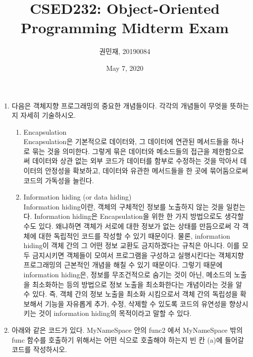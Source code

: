 \documentclass{article}
\begin{document}
    \author{권민재, 20190084}
    \title{CSED232: Object-Oriented Programming Midterm Exam}
    \date{May 7, 2020}
    \maketitle


    \begin{enumerate}[itemsep=30pt]
        \item 다음은 객체지향 프로그래밍의 중요한 개념들이다. 각각의 개념들이 무엇을 뜻하는지 자세히 기술하시오.
              \begin{enumerate}[label={\alph*.}, itemsep=15pt]
                  \item Encapsulation \\
                  Encapsulation은 기본적으로 데이터와, 그 데이터에 연관된 메서드들을 하나로 묶는 것을 의미한다.
                  그렇게 묶은 데이터와 메소드들의 접근을 제한함으로써 데이터와 상관 없는 외부 코드가 데이터를 함부로 수정하는 것을 막아서 데이터의 안정성을 확보하고,
                  데이터와 유관한 메서드들을 한 곳에 묶어둠으로써 코드의 가독성을 늘린다.
                  \item Information hiding (or data hiding) \\
                  Information hiding이란, 객체의 구체적인 정보를 노출하지 않는 것을 일컫는다.
                  Information hiding은 Encapsulation을 위한 한 가지 방법으로도 생각할 수도 있다.
                  왜냐하면 객체가 서로에 대한 정보가 없는 상태를 만듬으로써 각 객체에 대한 독립적인 코드를 작성할 수 있기 때문이다. 물론, information hiding이 객체 간의 그 어떤 정보 교환도 금지하겠다는 규칙은 아니다.
                  이를 모두 금지시키면 객체들이 모여서 프로그램을 구성하고 실행시킨다는 객체지향 프로그래밍의 근본적인 개념을 해칠 수 있기 때문이다.
                  그렇기 때문에 information hiding은, 정보를 무조건적으로 숨기는 것이 아닌, 메소드의 노출을 최소화하는 등의 방법으로 정보 노출을 최소화한다는 개념이라는 것을 알 수 있다.
                  즉, 객체 간의 정보 노출을 최소화 시킴으로서 객체 간의 독립성을 확보해서 기능을 자유롭게 추가, 수정, 삭제할 수 있도록 코드의 유연성을 향상시키는 것이
                  information hiding의 목적이라고 말할 수 있다.
              \end{enumerate}
        \item 아래와 같은 코드가 있다. MyNameSpace 안의 func2 에서 MyNameSpace 밖의 func 함수를 호출하기 위해서는 어떤 식으로 호출해야 하는지 빈 칸 (a)에 들어갈 코드를 작성하시오.

\end{enumerate}
\end{document}
